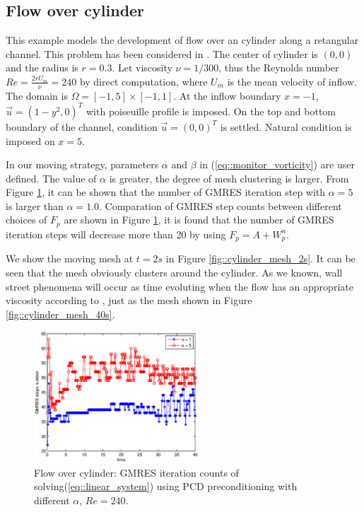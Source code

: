 \documentclass{eajam}
\begin{document}
   \subsection{Flow over cylinder}
   
      This example models the development of flow over an cylinder
      along a retangular channel. This problem has been considered in
      \cite{cao1999anr}. The center of cylinder is $(0, 0)$ and the
      radius is $r = 0.3$. Let viscosity $\nu = 1/300$, thus the
      Reynolds number $Re = \frac{2rU_{m}}{\nu} = 240$ by direct
      computation, where $U_{m}$ is the mean velocity of inflow. The
      domain is $\Omega = [-1, 5] \times [-1, 1]$. At the inflow
      boundary $x = -1$, $\vec{u} = (1 - y^2, 0)^T$ with poiseuille
      profile is imposed. On the top and bottom boundary of the
      channel, condition $\vec{u} = (0, 0)^T$ is settled. Natural
      condition is imposed on $x = 5$. 
      
      In our moving strategy, parameters $\alpha$ and $\beta$ in
      (\ref{eq::monitor_vorticity}) are user defined. The value of
      $\alpha$ is greater, the degree of mesh clustering is larger. 
      From Figure \ref{fig::cylinder_GMRES_steps_comparation}, it can be
      shown that the number of GMRES iteration step with $\alpha = 5$
      is larger than $\alpha = 1.0$. Comparation of GMRES step counts
      between different choices of $F_p$ are shown in Figure 
      \ref{fig::cylinder_GMRES_steps_comparation}, it is found that
      the number of GMRES iteration steps will decrease more than 20 by  
      using $F_p = A + W_p^n$.

      We show the moving mesh at $t = 2s$ in Figure
      \ref{fig::cylinder_mesh_2s}. It can be seen that the mesh obviously
      clusters around the cylinder. As we known, wall street phenomena
      will occur as time evoluting when the flow has an appropriate
      viscosity according to \cite{milton1982album}, just as the mesh
      shown in Figure \ref{fig::cylinder_mesh_40s}.
      
      \begin{figure}[!htbp]
        \begin{center}
          \includegraphics[width = 0.55\textwidth]{picture/obstacle_flow_data/iteration_steps_via_alpha.eps}
        \end{center}
        \caption{\small Flow over cylinder: GMRES iteration counts of
                 solving(\ref{eq::linear_system}) using PCD
                 preconditioning with different $\alpha$, $Re = 240$.}
        \label{fig::cylinder_GMRES_steps_comparation}
      \end{figure}
      
\end{document}
